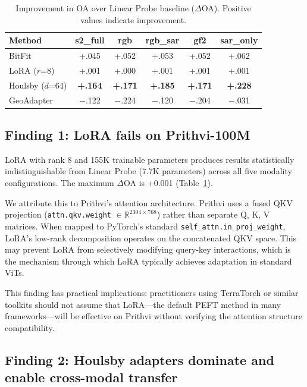 \documentclass{article}
\begin{document}
\begin{table}[htbp]
\centering
\caption{Improvement in OA over Linear Probe baseline ($\Delta$OA). Positive values indicate improvement.}
\label{tab:delta}
\begin{tabular}{lccccc}
\toprule
Method & s2\_full & rgb & rgb\_sar & gf2 & sar\_only \\
\midrule
BitFit & +.045 & +.052 & +.053 & +.052 & +.062 \\
LoRA ($r$=8) & +.001 & +.000 & +.001 & +.001 & +.001 \\
Houlsby ($d$=64) & \textbf{+.164} & \textbf{+.171} & \textbf{+.185} & \textbf{+.171} & \textbf{+.228} \\
GeoAdapter & $-$.122 & $-$.224 & $-$.120 & $-$.204 & $-$.031 \\
\bottomrule
\end{tabular}
\end{table}

\subsection{Finding 1: LoRA fails on Prithvi-100M}

LoRA with rank 8 and 155K trainable parameters produces results statistically indistinguishable from Linear Probe (7.7K parameters) across all five modality configurations. The maximum $\Delta$OA is +0.001 (Table~\ref{tab:delta}).

We attribute this to Prithvi's attention architecture. Prithvi uses a fused QKV projection (\texttt{attn.qkv.weight} $\in \mathbb{R}^{2304 \times 768}$) rather than separate Q, K, V matrices. When mapped to PyTorch's standard \texttt{self\_attn.in\_proj\_weight}, LoRA's low-rank decomposition operates on the concatenated QKV space. This may prevent LoRA from selectively modifying query-key interactions, which is the mechanism through which LoRA typically achieves adaptation in standard ViTs.

This finding has practical implications: practitioners using TerraTorch or similar toolkits should not assume that LoRA---the default PEFT method in many frameworks---will be effective on Prithvi without verifying the attention structure compatibility.

\subsection{Finding 2: Houlsby adapters dominate and enable cross-modal transfer}
\end{document}
